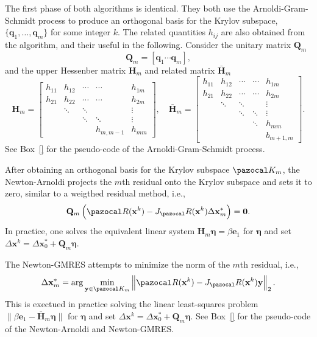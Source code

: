 The first phase of both algorithms is identical.
They both use the Arnoldi-Gram-Schmidt process to produce an orthogonal basis for the Krylov subspace, \(\{\mathbf q_1, \dots, \mathbf q_m\}\) for some integer \(k\).
The related quantities \(h_{ij}\) are also obtained from the algorithm, and their useful in the following.
Consider the unitary matrix \(\mathbf Q_m\)
\begin{equation}
  \mathbf Q_m = [\mathbf q_1 \cdots \mathbf q_m],
\end{equation}
and the upper Hessenber matrix \(\mathbf H_m\) and related matrix \(\bar{\mathbf H}_m\)
\begin{equation}
 \mathbf H_{m}=\left[\begin{array}{ccccc}
h_{11} & h_{12} & \cdots & \cdots & h_{1m} \\
h_{21} & h_{22} & \cdots & \cdots & h_{2m} \\
& \ddots & \ddots & & \vdots \\
& & \ddots & \ddots & \vdots \\
& & & h_{m,m-1} & h_{mm}
\end{array}\right] , \quad
  \bar{\mathbf H}_{m}=\left[\begin{array}{ccccc}
h_{11} & h_{12} & \cdots & \cdots & h_{1 m} \\
h_{21} & h_{22} & \cdots & \cdots & h_{2 m} \\
& \ddots & \ddots & & \vdots \\
& & \ddots & \ddots & \vdots \\
& & & \ddots & h_{m m} \\
& & & & b_{m+1, m}
\end{array}\right].
\end{equation}
See Box~\ref{} for the pseudo-code of the Arnoldi-Gram-Schmidt process.

After obtaining an orthogonal basis for the Krylov subspace \(\pazocal K_m\), the Newton-Arnoldi projects the \(m\)th residual onto the Krylov subspace and sets it to zero, similar to a weigthed residual method, i.e., 
\begin{equation}
  \mathbf Q_m \left(\pazocal R(\mathbf x^k) - J_\pazocal R(\mathbf x^k)\Delta \mathbf x^*_m\right) = \mathbf 0.
\end{equation}
In practice, one solves the equivalent linear system \(\mathbf H_m \boldsymbol{\eta} = \beta \mathbf e_1\) for \(\boldsymbol{\eta}\) and set \(\Delta \mathbf x^k  =\Delta \mathbf x^*_0 + \mathbf Q_m\boldsymbol \eta\).

The Newton-GMRES attempts to minimize the norm of the \(m\)th residual, i.e.,
\begin{equation}
  \Delta \mathbf x^*_m = \arg\min_{\mathbf y\in \pazocal K_m} \left\|\pazocal R(\mathbf x^k) - J_\pazocal R(\mathbf x^k)\mathbf y\right\|_2.
\end{equation} 
This is exectued in practice solving the linear least-squares problem \(\|\beta\mathbf e_1 -\bar{\mathbf H}_m \boldsymbol{\eta}\|\) for \(\boldsymbol{\eta}\) and set \(\Delta \mathbf x^k  =\Delta \mathbf x^*_0 + \mathbf Q_m\boldsymbol \eta\).
See Box~\ref{} for the pseudo-code of the Newton-Arnoldi and Newton-GMRES.

